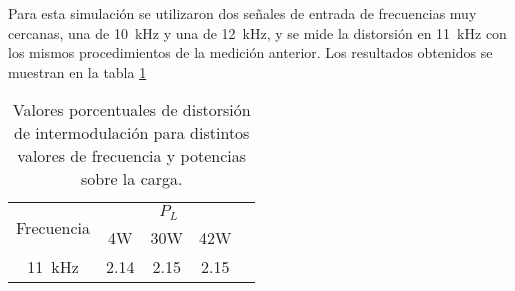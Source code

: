 Para esta simulación se utilizaron dos señales de entrada de frecuencias muy cercanas, una de \SI{10}{\kHz} y una de \SI{12}{\kHz}, y se mide la distorsión en \SI{11}{\kHz} con los mismos procedimientos de la medición anterior. Los resultados obtenidos se muestran en la tabla \ref{tab.intermod}

\begin{table}[H]
	\centering
	\begin{tabular}{ccccc}
		\toprule
\multirow{2}{*}{Frecuencia} & \multicolumn{3}{c}{$P_L$} \\ 
		\cmidrule{2-4}
			& 4W & 30W & 42W \\
		\midrule
		 \SI{11}{\kHz} & \num{2.14} & \num{2.15} & \num{2.15}\\
		 \bottomrule
	\end{tabular}
	\caption{Valores porcentuales de distorsión de intermodulación para distintos valores de frecuencia y potencias sobre la carga.}
	\label{tab.intermod}
\end{table}
